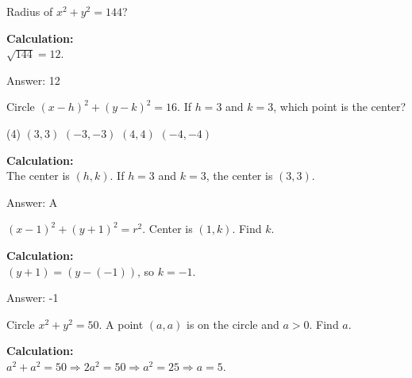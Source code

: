 \documentclass[11pt,paper=a4,answers]{exam}
\begin{document}
\begin{questions}
\question
Radius of $x^2 + y^2 = 144$?

\begin{solution}
\textbf{Calculation:} \\
$\sqrt{144} = 12$.

\vspace{30pt}

Answer: \colorbox{yellow!100}{12}
\end{solution}

\vspace{60pt}

\question
Circle $(x-h)^2 + (y-k)^2 = 16$. If $h=3$ and $k=3$, which point is the center?
\begin{tasks}(4)
    \task $(3, 3)$
    \task $(-3, -3)$
    \task $(4, 4)$
    \task $(-4, -4)$
\end{tasks}

\begin{solution}
\textbf{Calculation:} \\
The center is $(h, k)$. If $h=3$ and $k=3$, the center is $(3, 3)$.

\vspace{30pt}

Answer: \colorbox{yellow!100}{A}
\end{solution}

\vspace{60pt}

\question
$(x-1)^2 + (y+1)^2 = r^2$. Center is $(1, k)$. Find $k$.

\begin{solution}
\textbf{Calculation:} \\
$(y+1) = (y - (-1))$, so $k = -1$.

\vspace{30pt}

Answer: \colorbox{yellow!100}{-1}
\end{solution}

\vspace{60pt}

\question
Circle $x^2 + y^2 = 50$. A point $(a, a)$ is on the circle and $a>0$. Find $a$.

\begin{solution}
\textbf{Calculation:} \\
$a^2 + a^2 = 50 \Rightarrow 2a^2 = 50 \Rightarrow a^2 = 25 \Rightarrow a = 5$.


\end{solution}
\end{questions}
\end{document}
